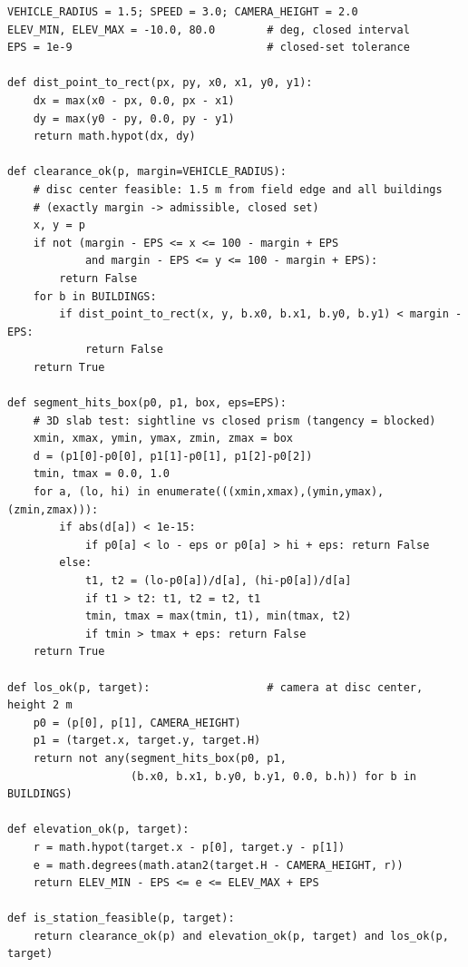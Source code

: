 \begin{lstlisting}[caption={Shared geometry engine: closed-set three-constraint
predicate (AI-assisted implementation, team-specified conventions).},label={lst:geom}]
VEHICLE_RADIUS = 1.5; SPEED = 3.0; CAMERA_HEIGHT = 2.0
ELEV_MIN, ELEV_MAX = -10.0, 80.0        # deg, closed interval
EPS = 1e-9                              # closed-set tolerance

def dist_point_to_rect(px, py, x0, x1, y0, y1):
    dx = max(x0 - px, 0.0, px - x1)
    dy = max(y0 - py, 0.0, py - y1)
    return math.hypot(dx, dy)

def clearance_ok(p, margin=VEHICLE_RADIUS):
    # disc center feasible: 1.5 m from field edge and all buildings
    # (exactly margin -> admissible, closed set)
    x, y = p
    if not (margin - EPS <= x <= 100 - margin + EPS
            and margin - EPS <= y <= 100 - margin + EPS):
        return False
    for b in BUILDINGS:
        if dist_point_to_rect(x, y, b.x0, b.x1, b.y0, b.y1) < margin - EPS:
            return False
    return True

def segment_hits_box(p0, p1, box, eps=EPS):
    # 3D slab test: sightline vs closed prism (tangency = blocked)
    xmin, xmax, ymin, ymax, zmin, zmax = box
    d = (p1[0]-p0[0], p1[1]-p0[1], p1[2]-p0[2])
    tmin, tmax = 0.0, 1.0
    for a, (lo, hi) in enumerate(((xmin,xmax),(ymin,ymax),(zmin,zmax))):
        if abs(d[a]) < 1e-15:
            if p0[a] < lo - eps or p0[a] > hi + eps: return False
        else:
            t1, t2 = (lo-p0[a])/d[a], (hi-p0[a])/d[a]
            if t1 > t2: t1, t2 = t2, t1
            tmin, tmax = max(tmin, t1), min(tmax, t2)
            if tmin > tmax + eps: return False
    return True

def los_ok(p, target):                  # camera at disc center, height 2 m
    p0 = (p[0], p[1], CAMERA_HEIGHT)
    p1 = (target.x, target.y, target.H)
    return not any(segment_hits_box(p0, p1,
                   (b.x0, b.x1, b.y0, b.y1, 0.0, b.h)) for b in BUILDINGS)

def elevation_ok(p, target):
    r = math.hypot(target.x - p[0], target.y - p[1])
    e = math.degrees(math.atan2(target.H - CAMERA_HEIGHT, r))
    return ELEV_MIN - EPS <= e <= ELEV_MAX + EPS

def is_station_feasible(p, target):
    return clearance_ok(p) and elevation_ok(p, target) and los_ok(p, target)
\end{lstlisting}

